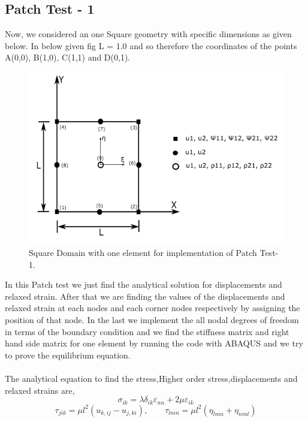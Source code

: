 \documentclass[12pt]{article}
\begin{document}
\subsection{Patch Test - 1}
Now, we considered an one Square geometry with specific dimensions as given below. In below given fig L = 1.0 and so therefore the coordinates of the points A(0,0), B(1,0), C(1,1) and D(0,1).  
\begin{figure}[H]
	\begin{center}
		\includegraphics[scale=0.8]{ele_1.png} 
	\end{center}  
   \caption{Square Domain with one element for implementation of Patch Test-1.}
\end{figure} 
In this Patch test we just find the analytical solution for displacements and relaxed strain.
After that we are finding the values of the displacements and relaxed strain at each nodes and each corner nodes respectively by assigning the position of that node. In the last we implement the all nodal degrees of freedom in terms of the boundary condition and we find the stiffness matrix and right hand side matrix for one element by running the code with ABAQUS and we try to prove the equilibrium equation.
\\
\\
The analytical equation to find the stress,Higher order stress,displacements and relaxed strains are,
\begin{equation}\label{p_sigma}
	\sigma_{ik} = \lambda \delta_{ik} \varepsilon_{nn} + 2 \mu \varepsilon_{ik}
\end{equation}
\begin{equation}
	\tau_{jik} = \mu l^2 (u_{k,ij}- u_{j,ki}) , \qquad \tau_{lmn} = \mu l^2 (\eta_{lmn} + \eta_{nml})	
\end{equation}
\end{document}
